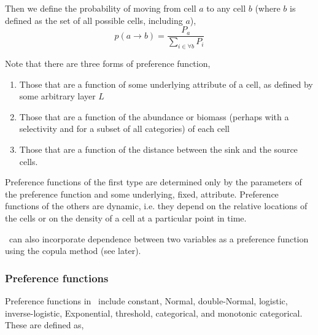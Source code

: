Then we define the probability of moving from cell $a$ to any cell $b$ (where $b$ is defined as the set of all possible cells, including $a$),
\begin{equation}
  p(a\rightarrow b) = \frac{P_a}{\sum\limits_{i \in \forall b} P_i}
\end{equation}

Note that there are three forms of preference function,
\begin{enumerate}
\item Those that are a function of some underlying attribute of a cell, as defined by some arbitrary layer $L$
\item Those that are a function of the abundance or biomass (perhaps with a selectivity and for a subset of all categories) of each cell
\item Those that are a function of the distance between the sink and the source cells. 
\end{enumerate} 

Preference functions of the first type are determined only by the parameters of the preference function and some underlying, fixed, attribute. Preference functions of the others are dynamic, i.e. they depend on the relative locations of the cells or on the density of a cell at a particular point in time.

\SPM\ can also incorporate dependence between two variables as a preference function using the copula method (see later).

\subsubsection*{Preference functions}

Preference functions in \SPM\ include constant, Normal, double-Normal, logistic, inverse-logistic, Exponential, threshold, categorical, and monotonic categorical. These are defined as,

